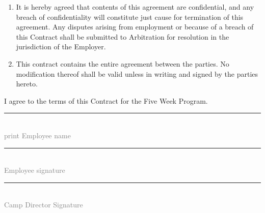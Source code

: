 \documentclass{rossasia}
\begin{document}
\begin{enumerate}
\item It is hereby agreed that contents of this agreement are confidential, and any breach of confidentiality will constitute just cause for termination of this agreement.  Any disputes arising from employment or because of a breach of this Contract shall be submitted to Arbitration for resolution in the jurisdiction of the Employer.  
\item This contract contains the entire agreement between the parties. No modification thereof shall be valid unless in writing and signed by the parties hereto.
\end{enumerate}

	I agree to the terms of this Contract for the Five Week Program.
	
	\vspace{0.75in}
	
	\hfill \rule{8cm}{.1mm}\\
	 \hspace*{10cm} \textcolor{gray}{\scriptsize print Employee name} %
	 
	\vspace{0.4in}
	
	\hfill \rule{8cm}{.1mm}\\
	 \hspace*{10cm} \textcolor{gray}{\scriptsize Employee signature} %
	 
	\vspace{0.75in}

	
	\hfill \rule{8cm}{.1mm}\\
	 \hspace*{10cm} \textcolor{gray}{\scriptsize Camp Director Signature} %
	
	 
\end{document}
